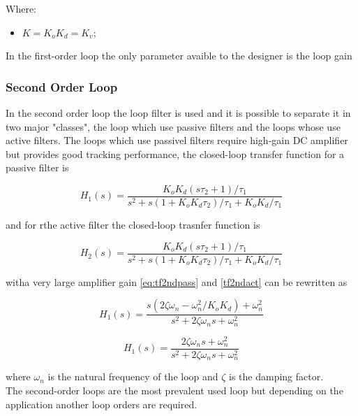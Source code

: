 Where:
\begin{itemize}
    \item $K = K_oK_d =K_v$;
\end{itemize}

In the first-order loop the only parameter avaible to the designer is the loop
gain

\subsubsection{Second Order Loop}

In the second order loop the loop filter is used and it is possible to separate
it in two major "classes", the loop which use passive filters and the loops
whose use active filters. The loops which use passivel filters require high-gain
DC amplifier but provides good tracking performance, the closed-loop transfer
function for a passive filter is

\begin{equation}
    H_1(s)=\frac{K_oK_d(s\tau_2+1)/\tau_1}
    {s^2+s(1+K_oK_d\tau_2)/\tau_1+K_oK_d/\tau_1}
    \label{eq:tf2ndpass}
\end{equation}

and for rthe active filter the closed-loop trasnfer function is

\begin{equation}
    H_2(s)= \frac{K_oK_d(s\tau_2+1)/\tau_1}
    {s^2+s(1+K_oK_d\tau_2)/\tau_1+K_oK_d/\tau_1}
    \label{eq:tf2ndact}
\end{equation}

witha very large amplifier gain \ref{eq:tf2ndpass} and \ref{tf2ndact} can be 
rewritten as

\begin{equation}
    H_1(s)= \frac{s(2\zeta\omega_n-\omega_n^2/K_oK_d)+\omega_n^2}
    {s^2+2\zeta\omega_ns+\omega_n^2}
    \label{eq:damph1}
\end{equation}

\begin{equation}
    H_1(s)= \frac{2\zeta\omega_ns+\omega_n^2}
    {s^2+2\zeta\omega_ns+\omega_n^2}
    \label{eq:damph2}
\end{equation}

where $\omega_n$ is the natural frequency of the loop and $\zeta$ is the damping
factor.\\

The second-order loops are the most prevalent used loop but depending on the
application another loop orders are required.

